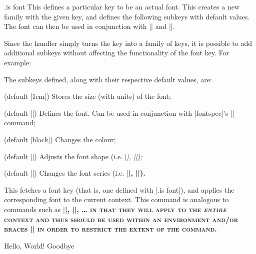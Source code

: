 \begin{handler}{.is font}
  This defines a particular key to be an actual font.  This creates a new family
  with the given key, and defines the following subkeys with default values.
  The font can then be used in conjunction with |\thesisgetfont| and
  |\thesisfont|.

  Since the handler simply turns the key into a family of keys, it is possible
  to add additional subkeys without affecting the functionality of the font
  key.  For example:

  \begin{codeexample}[]
  \end{codeexample}

  The subkeys defined, along with their respective default values, are:
  \begin{description}[font=\normalfont]
  \item[\marg{key}|/size|] (default |1em|) \newline
    Stores the size (with units) of the font;
  \item[\marg{key}|/font|] (default |\normalfont|) \newline
    Defines the font.  Can be used in conjunction with |fontspec|'s |\fontspec|
    command;
  \item[\marg{key}|/color|] (default |black|) \newline
    Changes the colour;
  \item[\marg{key}|/shape|] (default |\upshape|) \newline
    Adjusts the font shape (i.e. |\itshape|, |\scshape|);
  \item[\marg{key}|/series|] (default |\mdseries|) \newline
    Changes the font series (i.e. |\bfseries|, |\mdseries|).
  \end{description}
\end{handler}

\begin{command}{\thesisgetfont{}}
  This fetches a font key (that is, one defined with |.is font|), and applies
  the corresponding font to the current context.  This command is analogous to
  commands such as |\bfseries|, |\scshape|, \dots{} in that they will apply to
  the \emph{entire} context and thus should be used within an environment and/or
  braces |{}| in order to restrict the extent of the command.

\begin{codeexample}[]
{ Hello, World!} Goodbye
\end{codeexample}
\end{command}


